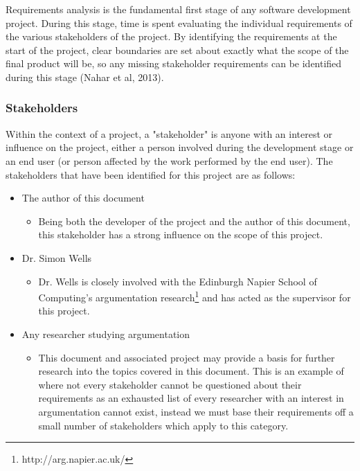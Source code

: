 \documentclass[12pt,a4paper]{article}
\begin{document}
Requirements analysis is the fundamental first stage of any software development project. During this stage, time is spent evaluating the individual requirements of the various stakeholders of the project. By identifying the requirements at the start of the project, clear boundaries are set about exactly what the scope of the final product will be, so any missing stakeholder requirements can be identified during this stage (Nahar et al, 2013).

\subsubsection{Stakeholders}

Within the context of a project, a "stakeholder" is anyone with an interest or influence on the project, either a person involved during the development stage or an end user (or person affected by the work performed by the end user). The stakeholders that have been identified for this project are as follows:
\begin{itemize}
    \item The author of this document
    \begin{itemize}
        \item Being both the developer of the project and the author of this document, this stakeholder has a strong influence on the scope of this project.
    \end{itemize}
    \item Dr. Simon Wells
    \begin{itemize}
        \item Dr. Wells is closely involved with the Edinburgh Napier School of Computing's argumentation research\footnote{http://arg.napier.ac.uk/} and has acted as the supervisor for this project.
    \end{itemize}
    \item Any researcher studying argumentation
    \begin{itemize}
        \item This document and associated project may provide a basis for further research into the topics covered in this document. This is an example of where not every stakeholder cannot be questioned about their requirements as an exhausted list of every researcher with an interest in argumentation cannot exist, instead we must base their requirements off a small number of stakeholders which apply to this category.
    \end{itemize}
\end{itemize}
\end{document}
